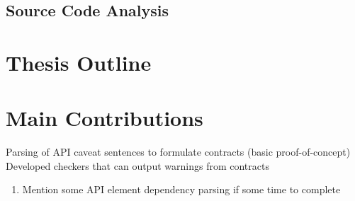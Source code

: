 \subsection{Source Code Analysis}

\section{Thesis Outline}
\label{sec:outline}

\section{Main Contributions}
Parsing of API caveat sentences to formulate contracts (basic proof-of-concept)
Developed checkers that can output warnings from contracts

\begin{enumerate}
	\item Mention some API element dependency parsing if some time to complete
\end{enumerate}
